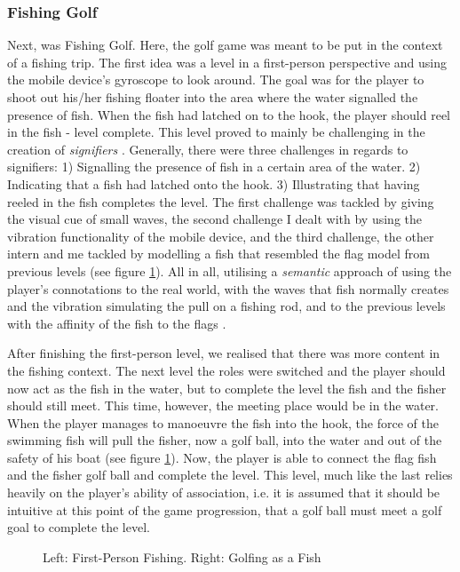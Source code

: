 \subsubsection{Fishing Golf}
Next, was Fishing Golf. Here, the golf game was meant to be put in the context of a fishing trip. The first idea was a level in a first-person perspective and using the mobile device's gyroscope to look around. The goal was for the player to shoot out his/her fishing floater into the area where the water signalled the presence of fish. When the fish had latched on to the hook, the player should reel in the fish - level complete. This level proved to mainly be challenging in the creation of \textit{signifiers} \cite{norman}. Generally, there were three challenges in regards to signifiers: 1) Signalling the presence of fish in a certain area of the water. 2) Indicating that a fish had latched onto the hook. 3) Illustrating that having reeled in the fish completes the level. The first challenge was tackled by giving the visual cue of small waves, the second challenge I dealt with by using the vibration functionality of the mobile device, and the third challenge, the other intern and me tackled by modelling a fish that resembled the flag model from previous levels (see figure \ref{Fishing}). All in all, utilising a \textit{semantic} approach of using the player's connotations to the real world, with the waves that fish normally creates and the vibration simulating the pull on a fishing rod, and to the previous levels with the affinity of the fish to the flags \cite{semantics}.

After finishing the first-person level, we realised that there was more content in the fishing context. The next level the roles were switched and the player should now act as the fish in the water, but to complete the level the fish and the fisher should still meet. This time, however, the meeting place would be in the water. When the player manages to manoeuvre the fish into the hook, the force of the swimming fish will pull the fisher, now a golf ball, into the water and out of the safety of his boat (see figure \ref{Fishing}). Now, the player is able to connect the flag fish and the fisher golf ball and complete the level. This level, much like the last relies heavily on the player's ability of association, i.e. it is assumed that it should be intuitive at this point of the game progression, that a golf ball must meet a golf goal to complete the level.
\begin{center}
  \begin{figure}[!htb]
    \noindent{}
    \caption{Left: First-Person Fishing. Right: Golfing as a Fish}
    \label{Fishing}
  \end{figure}
\end{center}
